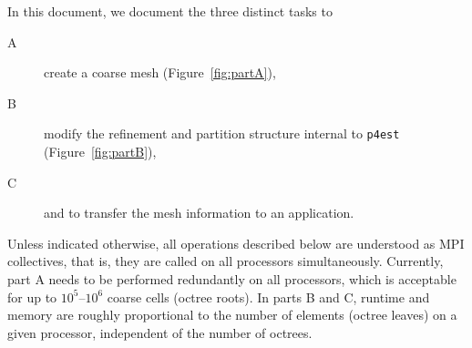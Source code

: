 \documentclass[letterpaper,11pt]{article}
\newcommand{\pforest}{\texttt{p4est}\xspace}
\newcommand{\figref}[1]{Figure~\ref{fig:#1}}
\begin{document}
In this document, we document the three distinct tasks to
\begin{description}
\item[A] create a coarse mesh (\figref{partA}),
\item[B] modify the refinement and partition structure internal to \pforest
  (\figref{partB}),
\item[C] and to transfer the mesh information to an application.
\end{description}
Unless indicated otherwise, all operations described below are understood as
MPI collectives, that is, they are called on all processors simultaneously.
Currently, part A needs to be performed redundantly on all processors, which is
acceptable for up to $10^5$--$10^6$ coarse cells (octree roots).  In parts B
and C, runtime and memory are roughly proportional to the number of elements
(octree leaves) on a given processor, independent of the number of octrees.
\end{document}
